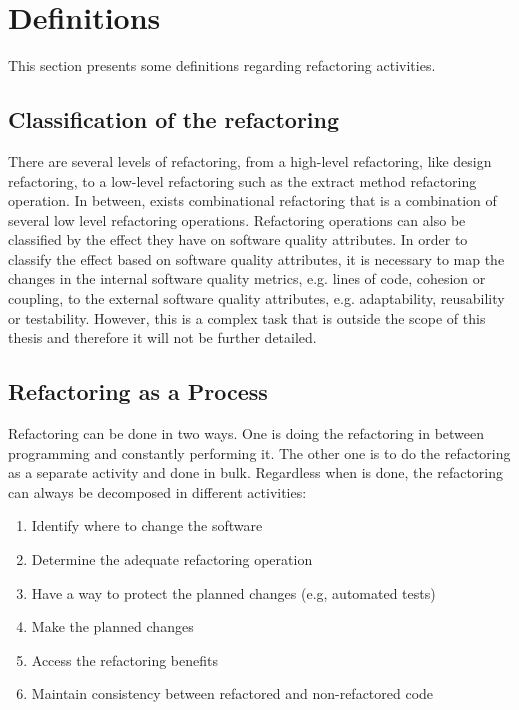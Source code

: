 
\section{Definitions}



This section presents some definitions regarding refactoring activities.

\subsection{Classification of the refactoring}
There are several levels of refactoring, from a high-level refactoring, like design refactoring, to a low-level refactoring such as the extract method refactoring operation.
In between, exists combinational refactoring that is a combination of several low level refactoring operations.
Refactoring operations can also be classified by the effect they have on software quality attributes.
In order to classify the effect based on software quality attributes, it is necessary to map the changes in the internal software quality metrics, e.g. lines of code, cohesion or coupling, to the external software quality attributes, e.g. adaptability, reusability or testability. \cite{elish2011classification}
However, this is a complex task that is outside the scope of this thesis and therefore it will not be further detailed.


\subsection{Refactoring as a Process}
Refactoring can be done in two ways. %
One is doing the refactoring in between programming and constantly performing it.
The other one is to do the refactoring as a separate activity and done in bulk.
Regardless when is done, the refactoring can always be decomposed in different activities: \cite{erb2010survey}

\begin{enumerate}
 \item Identify where to change the software
 \item Determine the adequate refactoring operation
 \item Have a way to protect the planned changes (e.g, automated tests)
 \item Make the planned changes
 \item Access the refactoring benefits
 \item Maintain consistency between refactored and non-refactored code
\end{enumerate}



